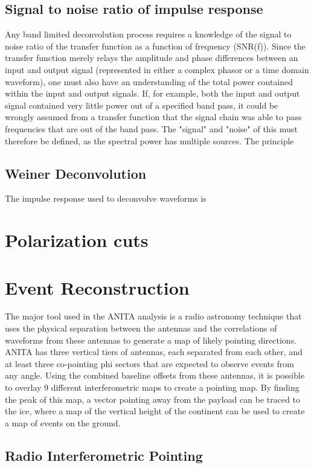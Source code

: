 	\subsection{Signal to noise ratio of impulse response}
		Any band limited deconvolution process requires a knowledge of the signal to noise ratio of the transfer function as a function of frequency (SNR(f)).  Since the transfer function merely relays the amplitude and phase differences between an input and output signal (represented in either a complex phasor or a time domain waveform), one must also have an understanding of the total power contained within the input and output signals.  If, for example, both the input and output signal contained very little power out of a specified band pass, it could be wrongly assumed from a transfer function that the signal chain was able to pass frequencies that are out of the band pass.
		The "signal" and "noise" of this must therefore be defined, as the spectral power has multiple sources.  The principle   
	\subsection{Weiner Deconvolution}
		The impulse response used to deconvolve waveforms is 

\section{Polarization cuts}

\section{Event Reconstruction}
	The major tool used in the ANITA analysis is a radio astronomy technique that uses the physical separation between the antennas and the correlations of waveforms from these antennas to generate a map of likely pointing directions.  ANITA has three vertical tiers of antennas, each separated from each other, and at least three co-pointing phi sectors that are expected to observe events from any angle.  Using the combined baseline offsets from these antennas, it is possible to overlay 9 different interferometric maps to create a pointing map.  By finding the peak of this map, a vector pointing away from the payload can be traced to the ice, where a map of the vertical height of the continent can be used to create a map of events on the ground.
	\subsection{Radio Interferometric Pointing}
